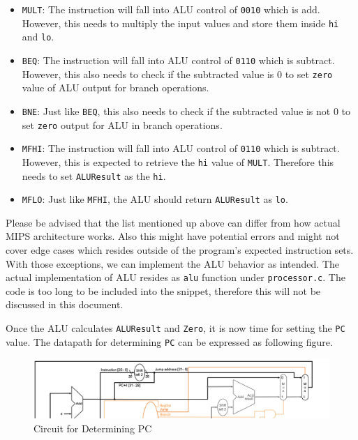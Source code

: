 \documentclass{homework}
\begin{document}
\begin{itemize}
    \item \texttt{MULT}: The instruction will fall into ALU control of \texttt{0010} which is add. However, this needs to multiply the input values and store them inside \texttt{hi} and \texttt{lo}. 
    \item \texttt{BEQ}: The instruction will fall into ALU control of \texttt{0110} which is subtract. However, this also needs to check if the subtracted value is 0 to set \texttt{zero} value of ALU output for branch operations. 
    \item \texttt{BNE}: Just like \texttt{BEQ}, this also needs to check if the subtracted value is not 0 to set \texttt{zero} output for ALU in branch operations.
    \item \texttt{MFHI}: The instruction will fall into ALU control of \texttt{0110} which is subtract. However, this is expected to retrieve the \texttt{hi} value of \texttt{MULT}. Therefore this needs to set \texttt{ALUResult} as the \texttt{hi}.
    \item \texttt{MFLO}: Just like \texttt{MFHI}, the ALU should return \texttt{ALUResult} as \texttt{lo}. 
\end{itemize}

Please be advised that the list mentioned up above can differ from how actual MIPS architecture works. Also this might have potential errors and might not cover edge cases which resides outside of the program's expected instruction sets. With those exceptions, we can implement the ALU behavior as intended. The actual implementation of ALU resides as \texttt{alu} function under \texttt{processor.c}. The code is too long to be included into the snippet, therefore this will not be discussed in this document.

Once the ALU calculates \texttt{ALUResult} and \texttt{Zero}, it is now time for setting the \texttt{PC} value. The datapath for determining \texttt{PC} can be expressed as following figure.

\begin{figure}[h]
\begin{center}
\includegraphics[scale=0.45]{determine_pc.png}    
\caption{Circuit for Determining PC}
\end{center}
\end{figure}
\end{document}
